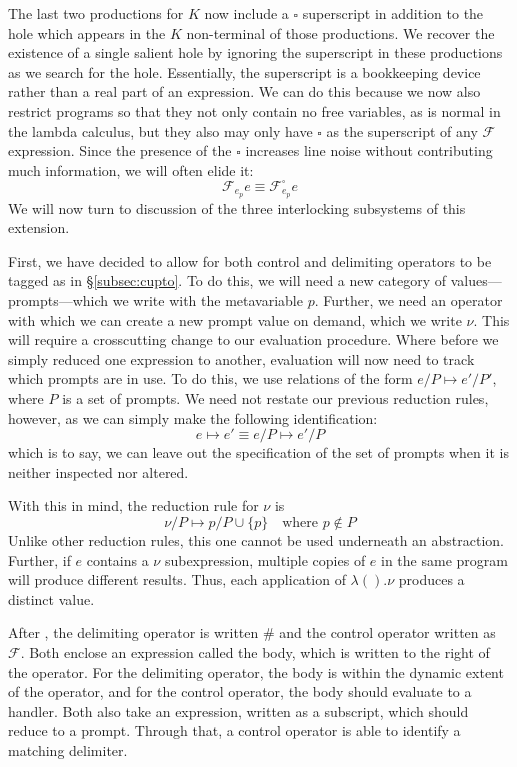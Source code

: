 \documentclass[11pt]{article}
\newcommand\F{\mathcal{F}}
\begin{document}
The last two productions for $K$ now include a $\square$ superscript in addition to the hole which appears in the $K$ non-terminal of those productions.
We recover the existence of a single salient hole by ignoring the superscript in these productions as we search for the hole.
Essentially, the superscript is a bookkeeping device rather than a real part of an expression.
We can do this because we now also restrict programs so that they not only contain no free variables, as is normal in the lambda calculus, but they also may only have $\square$ as the superscript of any $\F$ expression.
Since the presence of the $\square$ increases line noise without contributing much information, we will often elide it:
$$\F_{e_p}e \equiv \F_{e_p}^{\square}e$$
We will now turn to discussion of the three interlocking subsystems of this extension.

First, we have decided to allow for both control and delimiting operators to be tagged as in \S\ref{subsec:cupto}.
To do this, we will need a new category of values---prompts---which we write with the metavariable $p$.
Further, we need an operator with which we can create a new prompt value on demand, which we write $\nu$.
This will require a crosscutting change to our evaluation procedure.
Where before we simply reduced one expression to another, evaluation will now need to track which prompts are in use.
To do this, we use relations of the form $e/P \mapsto e'/P'$, where $P$ is a set of prompts.
We need not restate our previous reduction rules, however, as we can simply make the following identification:
$$e \mapsto e' \equiv e/P \mapsto e'/P$$
which is to say, we can leave out the specification of the set of prompts when it is neither inspected nor altered.

With this in mind, the reduction rule for $\nu$ is
$$\nu/P \mapsto p/P\cup\{p\} \quad\textrm{where }p \notin P$$
Unlike other reduction rules, this one cannot be used underneath an abstraction.
Further, if $e$ contains a $\nu$ subexpression, multiple copies of $e$ in the same program will produce different results.
Thus, each application of $\lambda().\nu$ produces a distinct value.


After \cite{PromptApplication}, the delimiting operator is written $\#$ and the control operator written as $\F$.
Both enclose an expression called the body, which is written to the right of the operator.
For the delimiting operator, the body is within the dynamic extent of the operator, and for the control operator, the body should evaluate to a handler.
Both also take an expression, written as a subscript, which should reduce to a prompt. Through that, a control operator is able to identify a matching delimiter.
\end{document}
